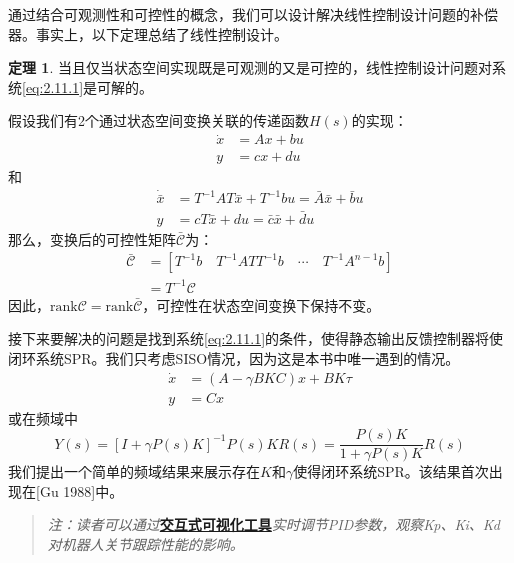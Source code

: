 \documentclass[UTF8,12pt,a4paper]{ctexart}
\theoremstyle{definition}
\newtheorem{theorem}{定理}[section]
\begin{document}
通过结合可观测性和可控性的概念，我们可以设计解决线性控制设计问题的补偿器。事实上，以下定理总结了线性控制设计。

\begin{theorem}
当且仅当状态空间实现既是可观测的又是可控的，线性控制设计问题对系统\eqref{eq:2.11.1}是可解的。
\end{theorem}

假设我们有2个通过状态空间变换关联的传递函数$H(s)$的实现：
\[
\begin{aligned}
\dot{x} &= Ax + bu \\
y &= cx + du
\end{aligned}
\]
和
\[
\begin{aligned}
\dot{\bar{x}} &= T^{-1}AT\bar{x} + T^{-1}bu = \bar{A}\bar{x} + \bar{b}u \\
y &= cT\bar{x} + du = \bar{c}\bar{x} + \bar{d}u
\end{aligned}
\]
那么，变换后的可控性矩阵$\bar{\mathcal{C}}$为：
\begin{equation}\label{eq:2.11.7}
\begin{aligned}
\bar{\mathcal{C}} &= [T^{-1}b \quad T^{-1}ATT^{-1}b \quad \cdots \quad T^{-1}A^{n-1}b] \\
&= T^{-1}\mathcal{C}
\end{aligned}
\end{equation}
因此，$\text{rank}\mathcal{C} = \text{rank}\bar{\mathcal{C}}$，可控性在状态空间变换下保持不变。

接下来要解决的问题是找到系统\eqref{eq:2.11.1}的条件，使得静态输出反馈控制器将使闭环系统SPR。我们只考虑SISO情况，因为这是本书中唯一遇到的情况。
\begin{equation}\label{eq:2.11.8}
\begin{aligned}
\dot{x} &= (A - \gamma BKC)x + BK\tau \\
y &= Cx
\end{aligned}
\end{equation}
或在频域中
\begin{equation}\label{eq:2.11.9}
Y(s) = [I + \gamma P(s)K]^{-1}P(s)KR(s) = \frac{P(s)K}{1+\gamma P(s)K}R(s)
\end{equation}
我们提出一个简单的频域结果来展示存在$K$和$\gamma$使得闭环系统SPR。该结果首次出现在[Gu 1988]中。

\begin{quote}
\textit{注：读者可以通过}\href{https://frankjie09.github.io/Robot-Manipulator-Control-CN/figures/PID_Tuning_Demo.html}{\textbf{交互式可视化工具}}\textit{实时调节PID参数，观察Kp、Ki、Kd对机器人关节跟踪性能的影响。}
\end{quote}
\end{document}
